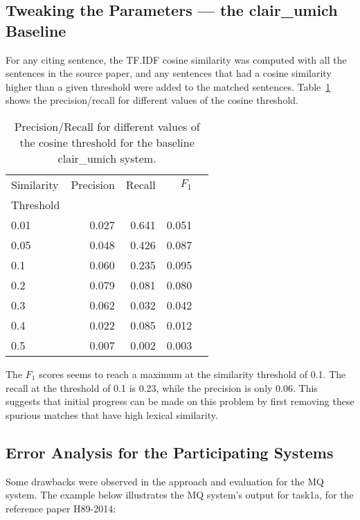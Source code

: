 \documentclass[11pt]{article}
\begin{document}
\subsection{Tweaking the Parameters --- the clair\_umich Baseline}
For any citing sentence, the TF.IDF cosine similarity was computed with all 
the sentences in the source paper, and any sentences that had a cosine 
similarity higher than a given threshold were added to the matched sentences. 
Table~\ref{tab:clairumichbaseline} shows the precision/recall for different 
values of the cosine threshold.
\begin{table}[h]
  \centering
  \begin{tabular}{|l|r|r|r|r|}
  	\hline
	Similarity & Precision & Recall & $F_1$ \\
	Threshold & & & \\
	\hline
	0.01 & 0.027 & 0.641 & 0.051\\
	0.05 & 0.048 & 0.426 & 0.087\\
	0.1 & 0.060 & 0.235 & 0.095\\
	0.2 & 0.079 & 0.081 & 0.080\\
	0.3 & 0.062 & 0.032 & 0.042\\
	0.4 & 0.022 & 0.085 & 0.012\\
	0.5 & 0.007 &  0.002 & 0.003\\
	\hline
  \end{tabular}
  \caption{Precision/Recall for different values of the cosine threshold 
  			for the baseline clair\_umich system.}
  \label{tab:clairumichbaseline}
\end{table}

The $F_1$ scores seems to reach a maximum at the similarity threshold of 0.1. 
The recall at the threshold of 0.1 is 0.23, while the precision is only 
0.06. This suggests that initial progress can be made on this problem by first 
removing these spurious matches that have high lexical similarity.
\subsection{Error Analysis for the Participating Systems}

Some drawbacks were observed in the approach and evaluation for the MQ system. 
The example below illustrates the MQ system's output for task1a, for the 
reference paper H89-2014:

\noindent{}
\end{document}

